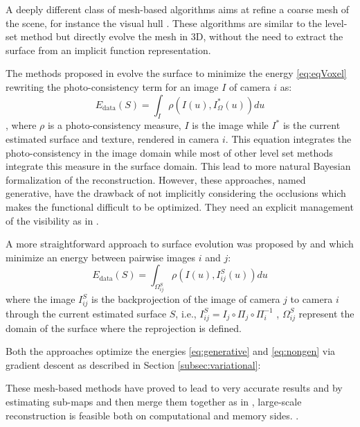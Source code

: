 A deeply different class of mesh-based algorithms aims at refine a coarse mesh of the scene, for instance the visual hull \cite{hiep2009towards,zaharescu2007transformesh,delaunoy_et_al_08,gargallo2007minimizing,delaunoy2011gradient,vu2011large}. These algorithms are similar to the level-set method but directly evolve the mesh in 3D, without the need to extract the surface from an implicit function representation.

The methods proposed in \cite{delaunoy_et_al_08,gargallo2007minimizing,delaunoy2011gradient} evolve the surface to minimize the energy \eqref{eq:eqVoxel} rewriting the photo-consistency term for an image $I$ of camera $i$ as:
\begin{equation}
\label{eq:generative}
  E_{\text{data}}(S) = \int_{\mathit{I}} \rho\left(I(\mathit{u}), I^*_{\Omega}(\mathit{u})\right) d\mathit{u}
\end{equation},
where $\rho$ is a photo-consistency measure, $I$ is the image while $I^*$ is the current estimated surface and texture, rendered in camera $i$.
This equation integrates the photo-consistency in the image domain while most of other level set methods integrate this measure in the surface domain. This lead to more natural Bayesian formalization of the reconstruction. 
However, these approaches, named generative, have the drawback of not implicitly considering the occlusions which makes the functional difficult to be optimized. They need an explicit management of the visibility as in \cite{delaunoy2011gradient}.

A more straightforward approach to surface evolution was proposed by \cite{hiep2009towards} and \cite{vu2011large} which minimize an energy between pairwise images $i$ and $j$:
\begin{equation}
\label{eq:nongen}
  E_{\text{data}}(S) = \int_{\Omega^{\mathit{S}}_{ij}} \rho\left(I(\mathit{u}), I^{\mathit{S}}_{ij}(\mathit{u})\right) d\mathit{u}
\end{equation}
where the image $I^{\mathit{S}}_{ij}$ is the backprojection of the image of camera $j$ to camera $i$ through the current estimated surface $\mathit{S}$, i.e., $I^{\mathit{S}}_{ij} = I_j \circ \Pi_j \circ \Pi_i^{-1}$ , $\Omega^{\mathit{S}}_{ij}$ represent the domain of the surface where the reprojection is defined.

Both the approaches optimize the energies \eqref{eq:generative} and \eqref{eq:nongen} via gradient descent as described in Section \ref{subsec:variational}:

These mesh-based methods have proved to lead to very accurate results and  by estimating  sub-maps and then merge them together as in \cite{vu2011large},  large-scale reconstruction is feasible both on computational and memory sides.
.

